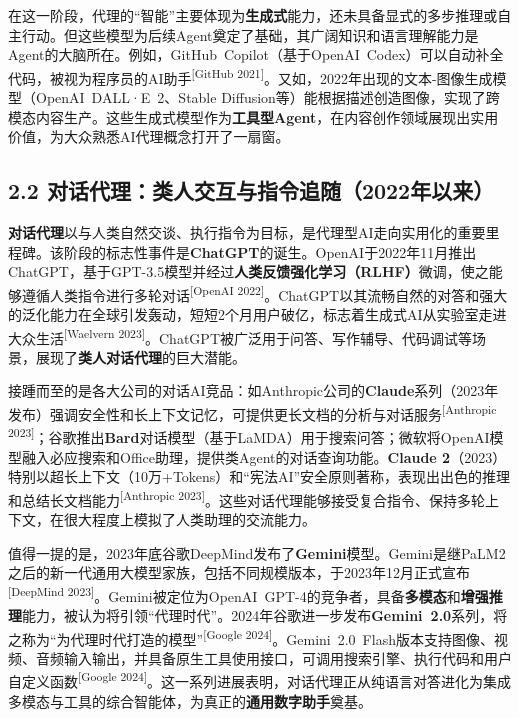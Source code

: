 \documentclass[
  letterpaper,
]{scrbook}
\begin{document}
在这一阶段，代理的``智能''主要体现为\textbf{生成式}能力，还未具备显式的多步推理或自主行动。但这些模型为后续Agent奠定了基础，其广阔知识和语言理解能力是Agent的大脑所在。例如，GitHub~Copilot（基于OpenAI~Codex）可以自动补全代码，被视为程序员的AI助手\textsuperscript{{[}GitHub
2021{]}}。又如，2022年出现的文本-图像生成模型（OpenAI~DALL·E~2、Stable
Diffusion等）能根据描述创造图像，实现了跨模态内容生产。这些生成式模型作为\textbf{工具型Agent}，在内容创作领域展现出实用价值，为大众熟悉AI代理概念打开了一扇窗。

\subsection{2.2
对话代理：类人交互与指令追随（2022年以来）}\label{ux5bf9ux8bddux4ee3ux7406ux7c7bux4ebaux4ea4ux4e92ux4e0eux6307ux4ee4ux8ffdux968f2022ux5e74ux4ee5ux6765}

\textbf{对话代理}以与人类自然交谈、执行指令为目标，是代理型AI走向实用化的重要里程碑。该阶段的标志性事件是\textbf{ChatGPT}的诞生。OpenAI于2022年11月推出ChatGPT，基于GPT-3.5模型并经过\textbf{人类反馈强化学习（RLHF）}微调，使之能够遵循人类指令进行多轮对话\textsuperscript{{[}OpenAI
2022{]}}。ChatGPT以其流畅自然的对答和强大的泛化能力在全球引发轰动，短短2个月用户破亿，标志着生成式AI从实验室走进大众生活\textsuperscript{{[}Waelvern
2023{]}}。ChatGPT被广泛用于问答、写作辅导、代码调试等场景，展现了\textbf{类人对话代理}的巨大潜能。

接踵而至的是各大公司的对话AI竞品：如Anthropic公司的\textbf{Claude}系列（2023年发布）强调安全性和长上下文记忆，可提供更长文档的分析与对话服务\textsuperscript{{[}Anthropic
2023{]}}；谷歌推出\textbf{Bard}对话模型（基于LaMDA）用于搜索问答；微软将OpenAI模型融入必应搜索和Office助理，提供类Agent的对话查询功能。\textbf{Claude
2}（2023）特别以超长上下文（10万+Tokens）和``宪法AI''安全原则著称，表现出出色的推理和总结长文档能力\textsuperscript{{[}Anthropic
2023{]}}。这些对话代理能够接受复合指令、保持多轮上下文，在很大程度上模拟了人类助理的交流能力。

值得一提的是，2023年底谷歌DeepMind发布了\textbf{Gemini}模型。Gemini是继PaLM2之后的新一代通用大模型家族，包括不同规模版本，于2023年12月正式宣布\textsuperscript{{[}DeepMind
2023{]}}。Gemini被定位为OpenAI~GPT-4的竞争者，具备\textbf{多模态}和\textbf{增强推理}能力，被认为将引领``代理时代''。2024年谷歌进一步发布\textbf{Gemini~2.0}系列，将之称为``为代理时代打造的模型''\textsuperscript{{[}Google
2024{]}}。Gemini~2.0~Flash版本支持图像、视频、音频输入输出，并具备原生工具使用接口，可调用搜索引擎、执行代码和用户自定义函数\textsuperscript{{[}Google
2024{]}}。这一系列进展表明，对话代理正从纯语言对答进化为集成多模态与工具的综合智能体，为真正的\textbf{通用数字助手}奠基。
\end{document}

